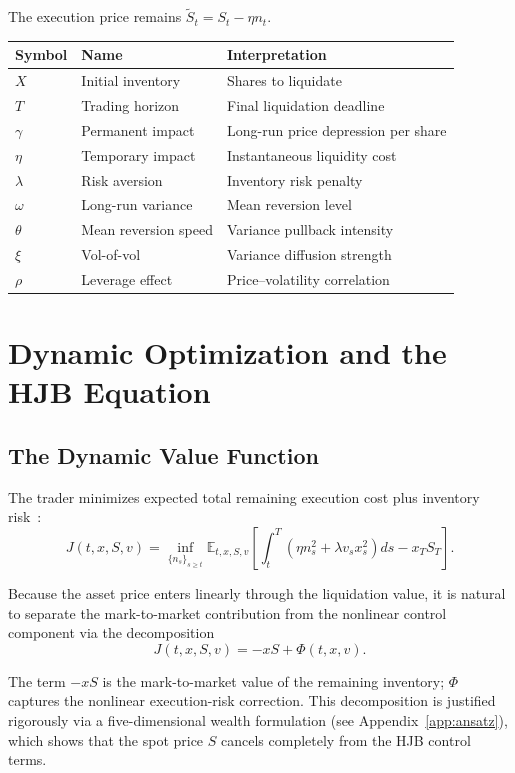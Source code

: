 \documentclass[11pt]{article}
\begin{document}
The execution price remains $\tilde{S}_t = S_t - \eta n_t$.

\begin{center}
\begin{tabular}{lll}
\toprule
Symbol & Name & Interpretation \\
\midrule
$X$ & Initial inventory & Shares to liquidate \\
$T$ & Trading horizon & Final liquidation deadline \\
$\gamma$ & Permanent impact & Long-run price depression per share \\
$\eta$ & Temporary impact & Instantaneous liquidity cost \\
$\lambda$ & Risk aversion & Inventory risk penalty \\
$\omega$ & Long-run variance & Mean reversion level \\
$\theta$ & Mean reversion speed & Variance pullback intensity \\
$\xi$ & Vol-of-vol & Variance diffusion strength \\
$\rho$ & Leverage effect & Price--volatility correlation \\
\bottomrule
\end{tabular}
\end{center}

\section{Dynamic Optimization and the HJB Equation}

\subsection{The Dynamic Value Function}

The trader minimizes expected total remaining execution cost plus inventory
risk~\cite{oksendal2003sde}:
\[
J(t,x,S,v)
=
\inf_{\{n_s\}_{s\ge t}}
\mathbb E_{t,x,S,v}
\left[
\int_t^T
\left(
\eta n_s^2
+
\lambda v_s x_s^2
\right)ds
-
x_TS_T
\right].
\]

Because the asset price enters linearly through the liquidation value, it is natural to separate
the mark-to-market contribution from the nonlinear control component via the decomposition
\[
J(t,x,S,v) = -xS + \Phi(t,x,v).
\]

The term $-xS$ is the mark-to-market value of the remaining inventory; $\Phi$ captures the
nonlinear execution-risk correction. This decomposition is justified rigorously via a
five-dimensional wealth formulation (see Appendix~\ref{app:ansatz}), which shows that the
spot price $S$ cancels completely from the HJB control terms.
\end{document}

